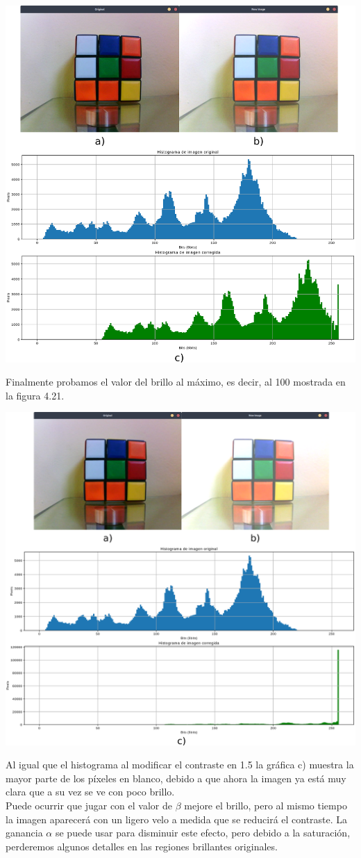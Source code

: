 \begin{center}
	\includegraphics[width=0.7 \textwidth]{Contenido/Cuerpo/Capitulo4/Fig21.eps}
	\label{Fig9}
\end{center}
Finalmente probamos el valor del brillo al máximo, es decir, al 100 mostrada en la figura 4.21.
\begin{center}
	\includegraphics[width=0.7 \textwidth]{Contenido/Cuerpo/Capitulo4/Fig22.eps}
	\label{Fig9}
\end{center}
Al igual que el histograma al modificar el contraste en 1.5 la gráfica c) muestra la mayor parte de los píxeles en blanco, debido
a que ahora la imagen ya está muy clara que a su vez se ve con poco brillo.\\
Puede ocurrir que jugar con el valor de $\beta$ mejore el brillo, pero al mismo tiempo la imagen aparecerá con un ligero
velo a medida que se reducirá el contraste. La ganancia $\alpha$ se puede usar para disminuir este efecto, pero debido a la
saturación, perderemos algunos detalles en las regiones brillantes originales.
